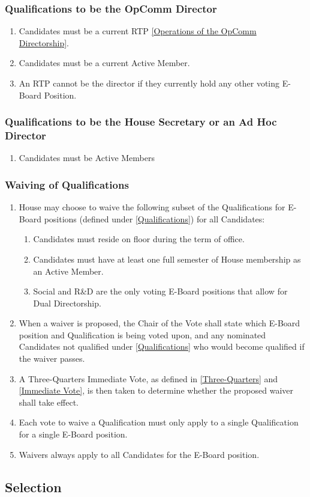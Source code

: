 \documentclass{article}
\newcommand{\asection}[1]{\subsection{#1} \label{#1}}
\newcommand{\asubsection}[1]{\subsubsection{#1} \label{#1}}
\begin{document}
\asubsection{Qualifications to be the OpComm Director}
\begin{enumerate}
	\item Candidates must be a current RTP \ref{Operations of the OpComm Directorship}.
	\item Candidates must be a current Active Member.
	\item An RTP cannot be the director if they currently hold any other voting E-Board Position.
\end{enumerate}

\asubsection{Qualifications to be the House Secretary or an Ad Hoc Director}
\begin{enumerate}
\item Candidates must be Active Members
\end{enumerate}

\asubsection{Waiving of Qualifications}
\begin{enumerate}
  \item House may choose to waive the following subset of the Qualifications for E-Board positions (defined under \ref{Qualifications}) for all Candidates:
    \begin{enumerate}
      \item Candidates must reside on floor during the term of office.
      \item Candidates must have at least one full semester of House membership as an Active Member.
      \item Social and R\&D are the only voting E-Board positions that allow for Dual Directorship.
    \end{enumerate}
  \item When a waiver is proposed, the Chair of the Vote shall state which E-Board position and Qualification is being voted upon, and any nominated Candidates not qualified under \ref{Qualifications} who would become qualified if the waiver passes.
  \item A Three-Quarters Immediate Vote, as defined in \ref{Three-Quarters} and \ref{Immediate Vote}, is then taken to determine whether the proposed waiver shall take effect.
  \item Each vote to waive a Qualification must only apply to a single Qualification for a single E-Board position.
  \item Waivers always apply to all Candidates for the E-Board position.
\end{enumerate}

\asection{Selection}
\end{document}
